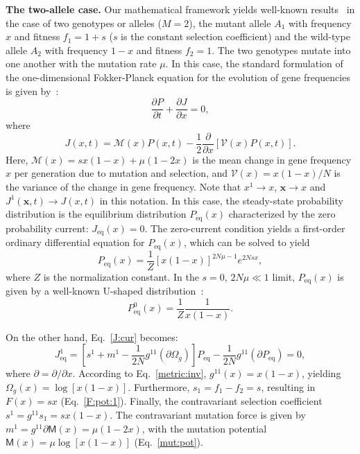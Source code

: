 \documentclass[9pt,twocolumn,twoside]{gsajnl}
\begin{document}
\noindent
\textbf{The two-allele case.} Our mathematical framework yields well-known results~\citep{Kimura1955,Kimura1962,Kimura1964} in the case of two genotypes or alleles ($M=2$),
the mutant allele $A_1$ with frequency $x$ and fitness $f_1 = 1 + s$ ($s$ is the constant selection coefficient) and the wild-type allele $A_2$ with frequency $1 - x$ and fitness $f_2 = 1$.
The two genotypes mutate into one another with the mutation rate $\mu$. In this case, the standard formulation of the one-dimensional Fokker-Planck equation for the evolution
of gene frequencies is given by~\citep{Kimura1955,Kimura1964}:
\begin{equation} \label{FP:Kimura}
\frac{\partial P}{\partial t} + \frac{\partial J}{\partial x} = 0,
\end{equation}
where
\begin{equation} \label{J:Kimura}
J(x,t) = \mathcal{M} (x) P(x,t) - \frac{1}{2} \frac{\partial}{\partial x} [\mathcal{V} (x) P(x,t)].
\end{equation}
Here, $\mathcal{M} (x) = sx(1-x) + \mu(1-2x)$ is the mean change in gene frequency $x$ per generation due to mutation and selection, and
$\mathcal{V} (x) = {x(1-x)}/{N}$ is the variance of the change in gene frequency.
Note that $x^1 \to x$, $\mathbf{x} \to x$ and $J^1 (\mathbf{x},t) \to J(x,t)$ in this notation.
In this case, the steady-state probability distribution is the equilibrium distribution $P_\text{eq} (x)$ characterized by the zero probability current: $J_\text{eq} (x) = 0$. 
The zero-current condition yields a first-order ordinary differential equation for $P_\text{eq} (x)$, which can be solved to yield
\begin{equation} \label{Peq:Kimura}
P_\text{eq} (x) = \frac{1}{Z} [x(1-x)]^{2 N \mu - 1} e^{2Nsx},
\end{equation}
where $Z$ is the normalization constant. In the $s=0$, $2 N \mu \ll 1$ limit, $P_\text{eq} (x)$ is given by a well-known U-shaped distribution~\citep{Kimura1964,Kimura1983}:
\begin{equation} \label{Peq:Kimura:U}
P_\text{eq}^0 (x) = \frac{1}{Z} \frac{1}{x(1-x)}.
\end{equation}

On the other hand, Eq.~\eqref{J:cur} becomes:
\begin{equation} \label{J:cur:eq:1}
J^{1}_\text{eq} = [ s^1 + m^1 - \frac{1}{2N} g^{11} (\partial \Omega_g) ] P_\text{eq} - \frac{1}{2N} g^{11} (\partial P_\text{eq}) = 0,
\end{equation}
where $\partial = \partial/\partial x$. According to Eq.~\eqref{metric:inv}, $g^{11} (x) = x(1 - x)$, yielding $\Omega_g (x) = \log [x (1-x)]$. Furthermore, $s_1 = f_1 - f_2 = s$, 
resulting in $F(x) = s x$ (Eq.~\eqref{F:pot:1}). Finally, the contravariant selection coefficient $s^1 = g^{11} s_1 = s x(1-x)$.
The contravariant mutation force is given by $m^1 = g^{11} \partial \mathsf{M} (x) = \mu (1 - 2x)$, with the mutation potential $\mathsf{M} (x) = \mu \log[x (1-x)]$ (Eq.~\eqref{mut:pot}).
\end{document}

